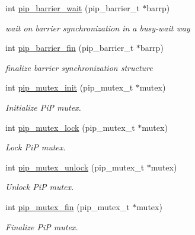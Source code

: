 \begin{DoxyCompactItemize}
\item 
int \hyperlink{group__libpip_gaca103c9732a8e28ee8faf79ef4a69e4f}{pip\-\_\-barrier\-\_\-wait} (pip\-\_\-barrier\-\_\-t $\ast$barrp)
\begin{DoxyCompactList}\small\item\em wait on barrier synchronization in a busy-\/wait way \end{DoxyCompactList}\end{DoxyCompactItemize}
\begin{DoxyCompactItemize}
\item 
int \hyperlink{group__libpip_ga70dab15271b84fe05d7088a6cf8bf784}{pip\-\_\-barrier\-\_\-fin} (pip\-\_\-barrier\-\_\-t $\ast$barrp)
\begin{DoxyCompactList}\small\item\em finalize barrier synchronization structure \end{DoxyCompactList}\end{DoxyCompactItemize}
\begin{DoxyCompactItemize}
\item 
int \hyperlink{group__libpip_gaff168395426838d385ad6720c9fb4184}{pip\-\_\-mutex\-\_\-init} (pip\-\_\-mutex\-\_\-t $\ast$mutex)
\begin{DoxyCompactList}\small\item\em Initialize Pi\-P mutex. \end{DoxyCompactList}\end{DoxyCompactItemize}
\begin{DoxyCompactItemize}
\item 
int \hyperlink{group__libpip_ga14f77d2413590f58d7a45a3b56960c90}{pip\-\_\-mutex\-\_\-lock} (pip\-\_\-mutex\-\_\-t $\ast$mutex)
\begin{DoxyCompactList}\small\item\em Lock Pi\-P mutex. \end{DoxyCompactList}\end{DoxyCompactItemize}
\begin{DoxyCompactItemize}
\item 
int \hyperlink{group__libpip_ga370bb79d84360fdb96169fc5cea789ee}{pip\-\_\-mutex\-\_\-unlock} (pip\-\_\-mutex\-\_\-t $\ast$mutex)
\begin{DoxyCompactList}\small\item\em Unlock Pi\-P mutex. \end{DoxyCompactList}\end{DoxyCompactItemize}
\begin{DoxyCompactItemize}
\item 
int \hyperlink{group__libpip_ga884fae0413bd07dbdb5f3940129b7b20}{pip\-\_\-mutex\-\_\-fin} (pip\-\_\-mutex\-\_\-t $\ast$mutex)
\begin{DoxyCompactList}\small\item\em Finalize Pi\-P mutex. \end{DoxyCompactList}\end{DoxyCompactItemize}


